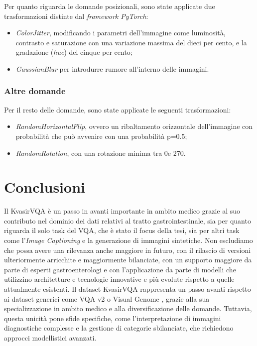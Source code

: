 \documentclass[../main.tex]{subfiles}
\begin{document}
Per quanto riguarda le domande posizionali, sono state applicate due trasformazioni distinte dal \textit{framework PyTorch}:

\begin{itemize}
    \item \textit{ColorJitter}, modificando i parametri dell'immagine come luminosità, contrasto e saturazione con una variazione massima del dieci per cento, e la gradazione (\textit{hue}) del cinque per cento;
    \item \textit{GaussianBlur} per introdurre rumore all'interno delle immagini.
\end{itemize}

\subsubsection{Altre domande}

Per il resto delle domande, sono state applicate le seguenti trasformazioni:

\begin{itemize}
    \item \textit{RandomHorizontalFlip}, ovvero un ribaltamento orizzontale dell'immagine con probabilità che può avvenire con una probabilità p=0.5;
    \item \textit{RandomRotation}, con una rotazione minima tra 0\degree e 270\degree.
\end{itemize}

\section{Conclusioni}

Il KvasirVQA è un passo in avanti importante in ambito medico grazie al suo contributo nel dominio dei dati relativi al tratto gastrointestinale, sia per quanto riguarda il solo task del VQA, che è stato il focus della tesi, sia per altri task come l'\textit{Image Captioning} e la generazione di immagini sintetiche. 
Non escludiamo che possa avere una rilevanza anche maggiore in futuro, con il rilascio di versioni ulteriormente arricchite e maggiormente bilanciate, con un supporto maggiore da parte di esperti gastroenterologi e con l'applicazione da parte di modelli che utilizzino architetture e tecnologie innovative e più evolute rispetto a quelle attualmente esistenti.
Il dataset KvasirVQA rappresenta un passo avanti rispetto ai dataset generici come VQA v2 \cite{DBLP:journals/corr/GoyalKSBP16} o Visual Genome \cite{DBLP:journals/corr/KrishnaZGJHKCKL16}, grazie alla sua specializzazione in ambito medico e alla diversificazione delle domande. Tuttavia, questa unicità pone sfide specifiche, come l'interpretazione di immagini diagnostiche complesse e la gestione di categorie sbilanciate, che richiedono approcci modellistici avanzati.
\end{document}
